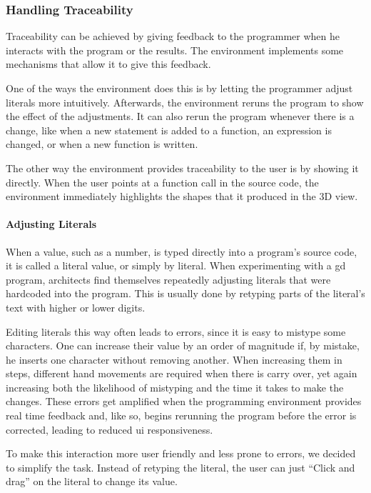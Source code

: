 \subsubsection{Handling Traceability}
Traceability can be achieved by giving feedback to the programmer when he interacts with the program or the results.
The environment implements some mechanisms that allow it to give this feedback.

One of the ways the environment does this is by letting the programmer adjust literals more intuitively.
Afterwards, the environment reruns the program to show the effect of the adjustments.
It can also rerun the program whenever there is a change, like when a new statement is added to a function, an expression is changed, or when a new function is written.

The other way the environment provides traceability to the user is by showing it directly.
When the user points at a function call in the source code, the environment immediately highlights the shapes that it produced in the 3D view.


\paragraph{Adjusting Literals}
When a value, such as a number, is typed directly into a program's source code, it is called a literal value, or simply by literal.
When experimenting with a \gls{gd} program, architects find themselves repeatedly adjusting literals that were hardcoded into the program.
This is usually done by retyping parts of the literal's text with higher or lower digits.

Editing literals this way often leads to errors, since it is easy to mistype some characters.
One can increase their value by an order of magnitude if, by mistake, he inserts one character without removing another.
When increasing them in steps, different hand movements are required when there is carry over, yet again increasing both the likelihood of mistyping and the time it takes to make the changes.
These errors get amplified when the programming environment provides real time feedback and, like so, begins rerunning the program before the error is corrected, leading to reduced \gls{ui} responsiveness.

To make this interaction more user friendly and less prone to errors, we decided to simplify the task.
Instead of retyping the literal, the user can just ``Click and drag'' on the literal to change its value.

